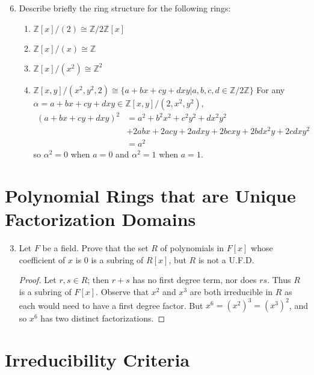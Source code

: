\documentclass{report}
\newcommand{\Z}{\mathbb{Z}}
\begin{document}
\begin{enumerate}
	\setcounter{enumi}{5}
   \item Describe briefly the ring structure for the following rings:
	   \begin{enumerate}
		   \item $\Z[x]/(2)\cong \Z/2\Z[x]$ 
		   \item $\Z[x]/(x) \cong \Z$
		   \item $\Z[x]/(x^2) \cong \Z^2$
		   \item $\Z[x,y]/(x^2,y^2,2) \cong \{a+bx+cy+dxy|a,b,c,d\in \Z/2\Z\}$
		   For any $\alpha=a+bx+cy+dxy\in\Z[x,y]/(2,x^2,y^2)$,
		   \begin{align*}
			   (a+bx+cy+dxy)^2 &= a^2 + b^2x^2+c^2y^2+dx^2y^2 \\
					   &+ 2abx+2acy+2adxy + 2bcxy + 2bdx^2y + 2cdxy^2\\
					  &= a^2
		   \end{align*}
		   so $\alpha^2=0$ when $a=0$ and $\alpha^2=1$ when $a=1$.
	   \end{enumerate}
		   
\end{enumerate}

\section{Polynomial Rings that are Unique Factorization Domains}

\begin{enumerate}
	\setcounter{enumi}{2}
	\item Let $F$ be a field. Prove that the set $R$ of polynomials in $F[x]$ whose coefficient of $x$ is $0$ is a subring of $R[x]$, but $R$ is not a U.F.D.
		\begin{proof}
			Let $r,s\in R$; then $r+s$ has no first degree term, nor does $rs$. Thus $R$ is a subring of $F[x]$. 
			Observe that $x^2$ and $x^3$ are both irreducible in $R$ as each would need to have a first degree factor.
			But $x^6=(x^2)^3=(x^3)^2$, and so $x^6$ has two distinct factorizations.
		\end{proof}
		
\end{enumerate}

\section{Irreducibility Criteria}
\end{document}
